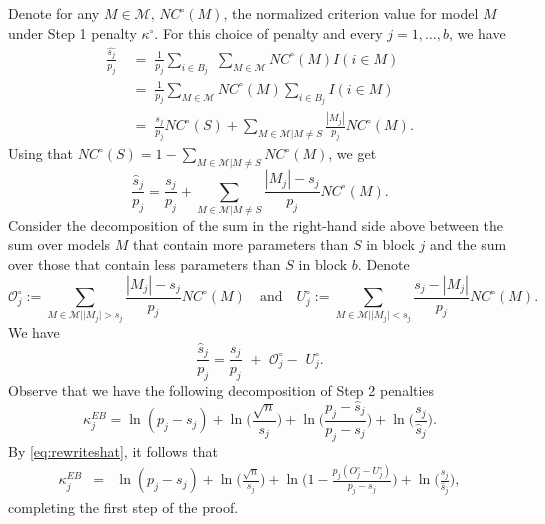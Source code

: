 \documentclass[
  12pt]{article}
\newcommand{\M}{\mathcal{M}}
\newcommand{\OO}{\mathcal{O}}
\begin{document}
Denote for any $M\in\M$, $NC^{\circ}(M)$, the normalized criterion value for model $M$ under Step 1 penalty $\kappa^{\circ}$. For this choice of penalty and every $j=1,\ldots,b$, we have
\begin{align*}
    \frac{\widehat{s_j}}{p_j}
    &\;=\; \frac{1}{p_j}\sum_{i\in B_j}\,\,\sum_{M\in \M}NC^{\circ}(M)I(i\in M)\\
   &\;=\; \frac{1}{p_j}\sum_{M \in \M}NC^{\circ}(M)\sum_{i \in B_j}I(i\in M) \\
   &\;=\;\frac{s_j}{p_j}NC^{\circ}(S) + \sum_{M \in \M | M \neq S}\frac{|M_j|}{p_j}NC^{\circ}(M).
\end{align*}
Using that $NC^{\circ}(S)=1-\sum_{M \in \M | M \neq S}NC^{\circ}(M)$, we get
\begin{equation*}
   \frac{\hat{s}_j}{p_j}
   =\frac{s_j}{p_j} + \sum_{M \in \M | M \neq S}\frac{|M_j|-s_j}{p_j}NC^{\circ}(M).
\end{equation*}
Consider the decomposition of the sum in the right-hand side above between the sum over models $M$ that contain more parameters than $S$ in block $j$ and the sum over those that contain less parameters than $S$  in block $b$. Denote
$$
    \OO_j^{\circ} := \sum_{M \in \M | |M_j| > s_j}\frac{|M_j|-s_j}{p_j}NC^{\circ}(M)\quad\text{and}\quad
    U_j^{\circ} := \sum_{M \in \M | |M_j| < s_j}\frac{s_j-|M_j|}{p_j}NC^{\circ}(M).
$$
We have
\begin{equation}\label{eq:rewriteshat}
  \frac{\hat{s}_j}{p_j}  = \frac{s_j}{p_j}\,\,+\,\, \OO_j^{\circ}-\,\,U_j^{\circ}.
\end{equation}
Observe that we have the following decomposition of Step 2 penalties
$$\kappa^{EB}_j
    = \ln(p_j-s_j) + \ln\Big(\frac{\sqrt{n}}{s_j}\Big) + \ln\Big(\frac{p_j-\hat{s}_j}{p_j-s_j}\Big) + \ln\Big(\frac{s_j}{\hat{s}_j}\Big). \nonumber$$
By \eqref{eq:rewriteshat}, it follows that
\begin{eqnarray}\label{eq:decompstep2pen}
    \kappa^{EB}_j&=& \ln(p_j-s_j)+\ln\Big(\frac{\sqrt{n}}{s_j}\Big)+\ln\Big(1-\frac{p_j(O^{\circ}_j-U^{\circ}_j)}{p_j-s_j}\Big)+\ln\Big(\frac{s_j}{\hat{s}_j}\Big),
\end{eqnarray}
completing the first step of the proof.
\end{document}
